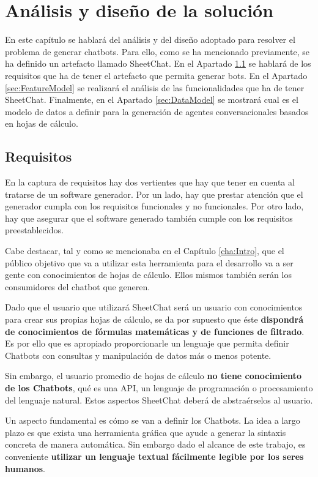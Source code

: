 \chapter{Análisis y diseño de la solución}
\label{cha:AnalysisAndDesign}

En este capítulo se hablará del análisis y del diseño adoptado para resolver el problema de generar chatbots. Para ello, como se ha mencionado previamente, se ha definido un artefacto llamado SheetChat. En el Apartado \ref{sec:Requisitos} se hablará de los requisitos que ha de tener el artefacto que permita generar bots. En el Apartado \ref{sec:FeatureModel} se realizará el análisis de las funcionalidades que ha de tener SheetChat. Finalmente, en el Apartado \ref{sec:DataModel} se mostrará cual es el modelo de datos a definir para la generación de agentes conversacionales basados en hojas de cálculo.

\section{Requisitos}
\label{sec:Requisitos}

En la captura de requisitos hay dos vertientes que hay que tener en cuenta al tratarse de un software generador. Por un lado, hay que prestar atención que el generador cumpla con los requisitos funcionales y no funcionales. Por otro lado, hay que asegurar que el software generado también cumple con los requisitos preestablecidos.

Cabe destacar, tal y como se mencionaba en el Capítulo \ref{cha:Intro}, que el público objetivo que va a utilizar esta herramienta para el desarrollo va a ser gente con conocimientos de hojas de cálculo. Ellos mismos también serán los consumidores del chatbot que generen.

Dado que el usuario que utilizará SheetChat será un usuario con conocimientos para crear sus propias hojas de cálculo, se da por supuesto que éste \textbf{dispondrá de conocimientos de fórmulas matemáticas y de funciones de filtrado}. Es por ello que es apropiado proporcionarle un lenguaje que permita definir Chatbots con consultas y manipulación de datos más o menos potente.

Sin embargo, el usuario promedio de hojas de cálculo \textbf{no tiene conocimiento de los Chatbots}, qué es una API, un lenguaje de programación o procesamiento del lenguaje natural. Estos aspectos SheetChat deberá de abstraérselos al usuario.

Un aspecto fundamental es cómo se van a definir los Chatbots. La idea a largo plazo es que exista una herramienta gráfica que ayude a generar la sintaxis concreta de manera automática. Sin embargo dado el alcance de este trabajo, es conveniente \textbf{utilizar un lenguaje textual fácilmente legible por los seres humanos}.

